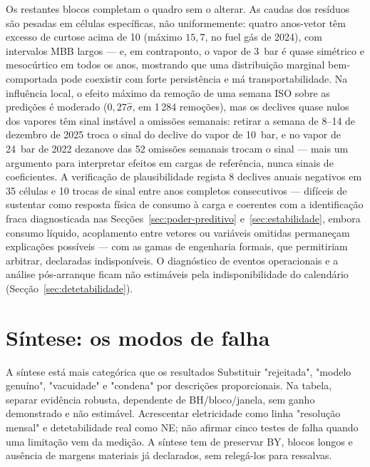 Os restantes blocos completam o quadro sem o alterar. As caudas dos resíduos
são pesadas em células específicas, não uniformemente: quatro anos-vetor têm
excesso de curtose acima de 10 (máximo $15{,}7$, no fuel gás de 2024), com
intervalos MBB largos --- e, em contraponto, o vapor de 3~bar é quase
simétrico e mesocúrtico em todos os anos, mostrando que uma distribuição
marginal bem-comportada pode coexistir com forte persistência e má
transportabilidade. Na influência local, o efeito máximo da remoção de uma
semana ISO sobre as predições é moderado ($0{,}27\hat\sigma$, em 1\,284
remoções), mas os declives quase nulos dos vapores têm sinal instável a
omissões semanais: retirar a semana de 8--14 de dezembro de 2025 troca o
sinal do declive do vapor de 10~bar, e no vapor de 24~bar de 2022 dezanove
das 52 omissões semanais trocam o sinal --- mais um argumento para
interpretar efeitos em cargas de referência, nunca sinais de coeficientes. A
verificação de plausibilidade regista 8 declives anuais negativos em 35
células e 10 trocas de sinal entre anos completos consecutivos ---
difíceis de sustentar como resposta física de consumo à carga e coerentes com
a identificação fraca diagnosticada nas Secções~\ref{sec:poder-preditivo} e~\ref{sec:estabilidade}, embora consumo líquido,
acoplamento entre vetores ou variáveis omitidas permaneçam explicações
possíveis --- com as gamas de engenharia formais, que permitiriam arbitrar,
declaradas indisponíveis. O diagnóstico de eventos operacionais e a
análise pós-arranque ficam não estimáveis pela indisponibilidade do
calendário (Secção~\ref{sec:detetabilidade}).


\section{Síntese: os modos de falha}
\label{sec:sintese-modos-falha}
{A síntese está mais categórica que os resultados}
{Substituir "rejeitada", "modelo genuíno", "vacuidade" e "condena" por
descrições proporcionais. Na tabela, separar evidência robusta,
dependente de BH/bloco/janela, sem ganho demonstrado e não estimável.
Acrescentar eletricidade como linha "resolução mensal" e detetabilidade
real como NE; não afirmar cinco testes de falha quando uma limitação
vem da medição. A síntese tem de preservar BY, blocos longos e ausência
de margens materiais já declarados, sem relegá-los para ressalvas.}%


